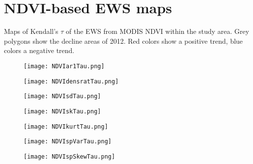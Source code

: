 \section{NDVI-based EWS maps}
Maps of Kendall's $ \tau $ of the EWS from MODIS NDVI within the study area. Grey polygons show the decline areas of 2012. Red colors show a positive trend, blue colors a negative trend.\\

\begin{figure}[htpb]
	\centering
	\texttt{[image: NDVIar1Tau.png]}
\end{figure}	

\begin{figure}[htpb]
	\centering
	\texttt{[image: NDVIdensratTau.png]}
\end{figure}	

\begin{figure}[htpb]
	\centering
	\texttt{[image: NDVIsdTau.png]}
\end{figure}	

\begin{figure}[htpb]
	\centering
	\texttt{[image: NDVIskTau.png]}
\end{figure}	

\begin{figure}[htpb]
	\centering
	\texttt{[image: NDVIkurtTau.png]}
\end{figure}	

\begin{figure}[htpb]
	\centering
	\texttt{[image: NDVIspVarTau.png]}
\end{figure}	

\begin{figure}[htpb]
	\centering
	\texttt{[image: NDVIspSkewTau.png]}
\end{figure}	
